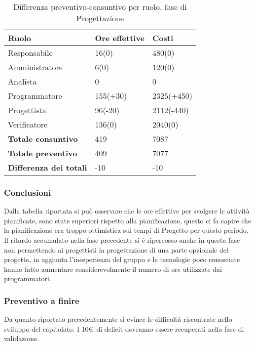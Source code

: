 	\begin{table}[H]
		\centering
	  \begin{tabular}{p{}p{}
		    							p{}}
		   \toprule Ruolo & Ore effettive & Costi \\
		   \midrule
		   Responsabile & 16(0) & 480(0) \\
		   Amministratore & 6(0) & 120(0) \\
		   Analista & 0 & 0 \\
		   Programmatore & 155(+30) & 2325(+450) \\
		   Progettista & 96(-20) & 2112(-440) \\
		   Verificatore & 136(0) & 2040(0) \\
		   \hline
		   \textbf{Totale consuntivo} & 419 & 7087 \\
		   \textbf{Totale preventivo} & 409 & 7077 \\
		   \textbf{Differenza dei totali} & -10 & -10 \\
		   \bottomrule
	 \end{tabular}
	 	\label{tab:costuntivoCodifica}
	 	\caption{Differenza preventivo-consuntivo per ruolo, fase di Progettazione}
	\end{table}

\subsubsection{Conclusioni}

Dalla tabella riportata si può osservare che le ore effettive per svolgere le attività pianificate, sono state superiori rispetto alla pianificazione, questo ci fa capire che la pianificazione era troppo ottimistica sui tempi di Progetto per questo periodo.
Il ritardo accumulato nella fase precedente si è ripercosso anche in questa fase non permettendo ai progettisti la progettazione di una parte opzionale del progetto, in aggiunta l'inesperienza del gruppo e le tecnologie poco conosciute hanno fatto aumentare considerevolmente il numero di ore utilizzate dai programmatori.

\subsubsection{Preventivo a finire}{
	Da quanto riportato precedentemente si evince le difficoltà riscontrate nello sviluppo del capitolato. I 10\euro\ di deficit dovranno essere recuperati nella fase di validazione.
}




